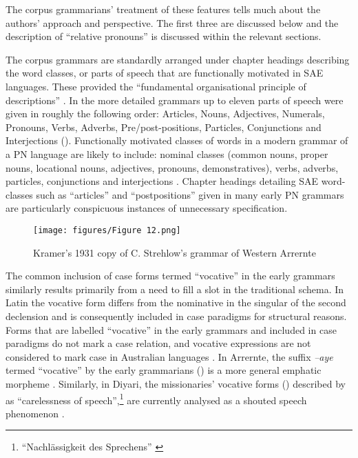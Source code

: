 The corpus grammarians' treatment of these features tells much about the authors' approach and perspective. The first three are discussed below and the description of “relative pronouns” is discussed within the relevant sections.

The corpus grammars are standardly arranged under chapter headings describing the word classes, or parts of speech that are functionally motivated in SAE languages. These provided the “fundamental organisational principle of descriptions” \citep[187]{koch_r_2008}. In the more detailed grammars up to eleven parts of speech were given in roughly the following order: Articles, Nouns, Adjectives, Numerals, Pronouns, Verbs, Adverbs, Pre/post-positions, Particles, Conjunctions and Interjections (). Functionally motivated classes of words in a modern grammar of a PN language are likely to include: nominal classes (common nouns, proper nouns, locational nouns, adjectives, pronouns, demonstratives), verbs, adverbs, particles, conjunctions and interjections \citep[271]{dixon_languages_1980}. Chapter headings detailing SAE word-classes such as “articles” and “postpositions” given in many early PN grammars are particularly conspicuous instances of unnecessary specification.

\begin{figure}
\texttt{[image: figures/Figure 12.png]}
\caption{Kramer's 1931 copy of C. Strehlow's grammar of Western Arrernte \citep{kramer_ernst_1931}}
\label{fig:key:2-12}
\end{figure}

The common inclusion of case forms termed “vocative” in the early grammars similarly results primarily from a need to fill a slot in the traditional schema. In Latin the vocative form differs from the nominative in the singular of the second declension and is consequently included in case paradigms for structural reasons. Forms that are labelled “vocative” in the early grammars and included in case paradigms do not mark a case relation, and vocative expressions are not considered to mark case in Australian languages \citep[8]{blake_case_2001}. In Arrernte, the suffix \textit{–aye} termed “vocative” by the early grammarians () is a more general emphatic morpheme \citep[353]{wilkins_mparntwe_1989}. Similarly, in Diyari, the missionaries' vocative forms () described by \citet[no pag.]{koch_untitled_1868} as “carelessness of speech”,\footnote{“Nachlässigkeit des Sprechens'' \citep[no pag.]{koch_untitled_1868}} are currently analysed as a shouted speech phenomenon \citep[39]{austin_grammar_2013}.


